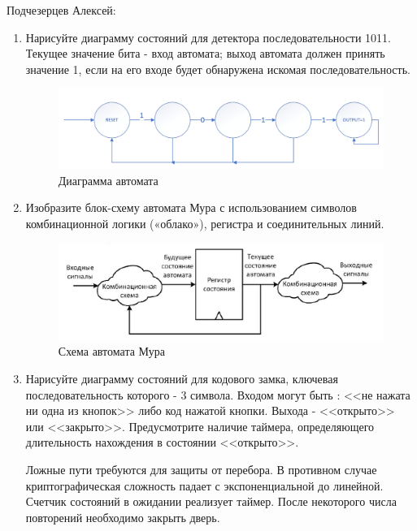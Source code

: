 \documentclass[a4paper,14pt]{article}
\begin{document}
	Подчезерцев Алексей:
	
	\begin{enumerate}
		\item Нарисуйте диаграмму состояний для детектора последовательности 1011. 
		Текущее значение бита - вход автомата; выход автомата должен принять значение 1, если на его входе будет обнаружена искомая последовательность.
		
		\begin{figure}[H]
			\centering
			\includegraphics[width=0.9\linewidth]{images/q_1}
			\caption{Диаграмма автомата}
			\label{fig:q_1}
		\end{figure}
	
		\item Изобразите блок-схему автомата Мура с использованием символов комбинационной логики («облако»), регистра и соединительных линий.
		
		\begin{figure}[H]
			\centering
			\includegraphics[width=0.9\linewidth]{images/q_2}
			\caption{Схема автомата Мура}
			\label{fig:q_2}
		\end{figure}
	
		\item Нарисуйте диаграмму состояний для кодового замка, ключевая последовательность	которого - 3 символа. 
		Входом могут быть : <<не нажата ни одна из кнопок>> либо код нажатой кнопки. 
		Выхода - <<открыто>> или <<закрыто>>. 
		Предусмотрите наличие таймера, определяющего длительность нахождения в состоянии <<открыто>>.
		
		Ложные пути требуются для защиты от перебора.
		В противном случае криптографическая сложность падает с экспоненциальной до линейной.
		Счетчик состояний в ожидании реализует таймер. 
		После некоторого числа повторений необходимо закрыть дверь.
		

\end{enumerate}
\end{document}
